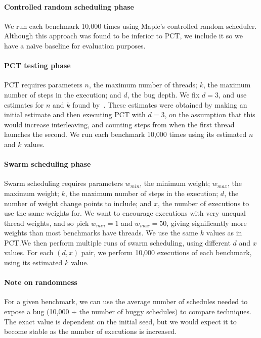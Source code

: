 \paragraph{Controlled random scheduling phase}
We run each benchmark 10,000 times using Maple's controlled random scheduler.  Although
this approach was found to be inferior to PCT\cite{thomson2016}, we include it
so we have a na\"{\i}ve baseline for evaluation purposes.

\paragraph{PCT testing phase}
PCT requires parameters $n$, the maximum number of threads; $k$, the maximum
number of steps in the execution; and $d$, the bug depth.  We fix $d=3$, and use
estimates for $n$ and $k$ found by~\cite{thomson2016}.  These estimates were
obtained by making an initial estimate and then executing PCT with $d=3$, on the
assumption that this would increase interleaving, and counting steps from when
the first thread launches the second.  We run each benchmark 10,000 times using
its estimated $n$ and $k$ values.

\paragraph{Swarm scheduling phase}
Swarm scheduling requires parameters $w_{min}$, the minimum weight; $w_{max}$,
the maximum weight; $k$, the maximum number of steps in the execution; $d$, the
number of weight change points to include; and $x$, the number of executions to
use the same weights for.  We want to encourage executions with very unequal
thread weights, and so pick $w_{min}=1$ and $w_{max}=50$, giving significantly
more weights than most benchmarks have threads.  We use the same $k$ values as
in PCT.\@ We then perform multiple runs of swarm scheduling, using different $d$
and $x$ values.  For each $(d, x)$ pair, we perform 10,000 executions of each
benchmark, using its estimated $k$ value.

\paragraph{Note on randomness}
For a given benchmark, we can use the average number of schedules
needed to expose a bug (10,000 $\div$ the number of buggy schedules)
to compare techniques.  The exact value is dependent on the initial
seed, but we would expect it to become stable as the number of
executions is increased\cite{thomson2016}.


